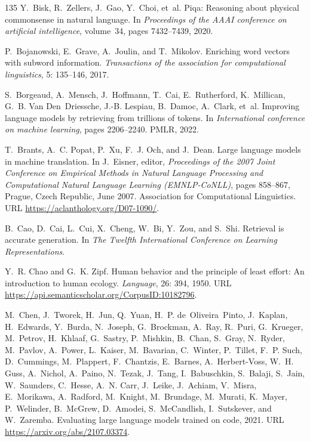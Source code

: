 \begin{thebibliography}{135}
Y.~Bisk, R.~Zellers, J.~Gao, Y.~Choi, et~al.
\newblock Piqa: Reasoning about physical commonsense in natural language.
\newblock In \emph{Proceedings of the AAAI conference on artificial
  intelligence}, volume~34, pages 7432--7439, 2020.

P.~Bojanowski, E.~Grave, A.~Joulin, and T.~Mikolov.
\newblock Enriching word vectors with subword information.
\newblock \emph{Transactions of the association for computational linguistics},
  5: 135--146, 2017.

S.~Borgeaud, A.~Mensch, J.~Hoffmann, T.~Cai, E.~Rutherford, K.~Millican, G.~B.
  Van Den~Driessche, J.-B. Lespiau, B.~Damoc, A.~Clark, et~al.
\newblock Improving language models by retrieving from trillions of tokens.
\newblock In \emph{International conference on machine learning}, pages
  2206--2240. PMLR, 2022.

T.~Brants, A.~C. Popat, P.~Xu, F.~J. Och, and J.~Dean.
\newblock Large language models in machine translation.
\newblock In J.~Eisner, editor, \emph{Proceedings of the 2007 Joint Conference
  on Empirical Methods in Natural Language Processing and Computational Natural
  Language Learning ({EMNLP}-{C}o{NLL})}, pages 858--867, Prague, Czech
  Republic, June 2007. Association for Computational Linguistics.
\newblock URL \url{https://aclanthology.org/D07-1090/}.

B.~Cao, D.~Cai, L.~Cui, X.~Cheng, W.~Bi, Y.~Zou, and S.~Shi.
\newblock Retrieval is accurate generation.
\newblock In \emph{The Twelfth International Conference on Learning
  Representations}.

Y.~R. Chao and G.~K. Zipf.
\newblock Human behavior and the principle of least effort: An introduction to
  human ecology.
\newblock \emph{Language}, 26: 394, 1950.
\newblock URL \url{https://api.semanticscholar.org/CorpusID:10182796}.

M.~Chen, J.~Tworek, H.~Jun, Q.~Yuan, H.~P. de~Oliveira~Pinto, J.~Kaplan,
  H.~Edwards, Y.~Burda, N.~Joseph, G.~Brockman, A.~Ray, R.~Puri, G.~Krueger,
  M.~Petrov, H.~Khlaaf, G.~Sastry, P.~Mishkin, B.~Chan, S.~Gray, N.~Ryder,
  M.~Pavlov, A.~Power, L.~Kaiser, M.~Bavarian, C.~Winter, P.~Tillet, F.~P.
  Such, D.~Cummings, M.~Plappert, F.~Chantzis, E.~Barnes, A.~Herbert-Voss,
  W.~H. Guss, A.~Nichol, A.~Paino, N.~Tezak, J.~Tang, I.~Babuschkin, S.~Balaji,
  S.~Jain, W.~Saunders, C.~Hesse, A.~N. Carr, J.~Leike, J.~Achiam, V.~Misra,
  E.~Morikawa, A.~Radford, M.~Knight, M.~Brundage, M.~Murati, K.~Mayer,
  P.~Welinder, B.~McGrew, D.~Amodei, S.~McCandlish, I.~Sutskever, and
  W.~Zaremba.
\newblock Evaluating large language models trained on code, 2021.
\newblock URL \url{https://arxiv.org/abs/2107.03374}.


\end{thebibliography}
